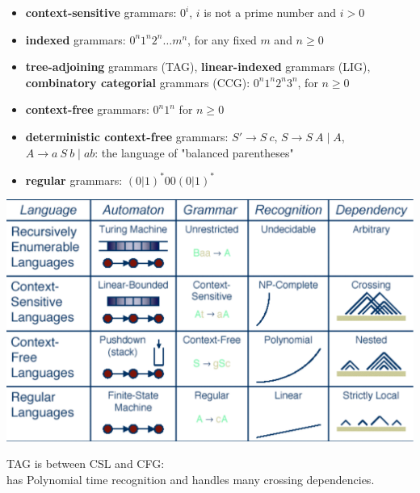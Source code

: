 \documentclass[landscape]{slides}
\begin{document}
\begin{slide}{}
\begin{itemize}
\item {\bf context-sensitive} grammars: $0^i$, $i$ is not a prime
number and $i > 0$
\item {\bf indexed} grammars: $0^n 1^n 2^n \ldots m^n$, for any fixed
$m$ and $n \geq 0$
\item {\bf tree-adjoining} grammars (TAG), {\bf linear-indexed}
grammars (LIG), {\bf combinatory categorial} grammars (CCG): $0^n 1^n
2^n 3^n$, for $n \geq 0$
\item {\bf context-free} grammars: $0^n 1^n$ for $n \geq 0$
\item {\bf deterministic context-free} grammars: $S' \rightarrow S\
c$, $S \rightarrow S\ A \mid A$, $A \rightarrow a\ S\ b \mid ab$: the
language of "balanced parentheses"
\item {\bf regular} grammars: $(0|1)^\ast00(0|1)^\ast$
\end{itemize}
\end{slide}

\begin{slide}{}
\begin{center}
\includegraphics[width=8in]{chomskyhier}

\centering
TAG is between CSL and CFG: \\
has Polynomial time recognition and handles many crossing dependencies.

\end{center}
\end{slide}
\end{document}
